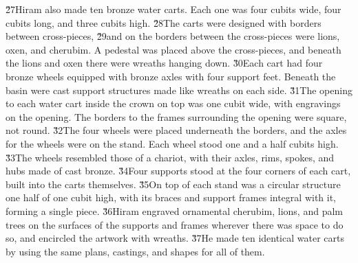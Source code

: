\v{27}Hiram also made ten bronze water carts. Each one was four cubits wide, four cubits long, and three cubits high. \v{28}The carts were designed with borders between cross-pieces, \v{29}and on the borders between the cross-pieces were lions, oxen, and cherubim. A pedestal was placed above the cross-pieces, and beneath the lions and oxen there were wreaths hanging down. \v{30}Each cart had four bronze wheels equipped with bronze axles with four support feet. Beneath the basin were cast support structures made like wreaths on each side. \v{31}The opening to each water cart inside the crown on top was one cubit wide, with engravings on the opening. The borders to the frames surrounding the opening were square, not round. \v{32}The four wheels were placed underneath the borders, and the axles for the wheels were on the stand. Each wheel stood one and a half cubits high. \v{33}The wheels resembled those of a chariot, with their axles, rims, spokes, and hubs made of cast bronze. \v{34}Four supports stood at the four corners of each cart, built into the carts themselves. \v{35}On top of each stand was a circular structure one half of one cubit high, with its braces and support frames integral with it, forming a single piece. \v{36}Hiram engraved ornamental cherubim, lions, and palm trees on the surfaces of the supports and frames wherever there was space to do so, and encircled the artwork with wreaths. \v{37}He made ten identical water carts by using the same plans, castings, and shapes for all of them.

